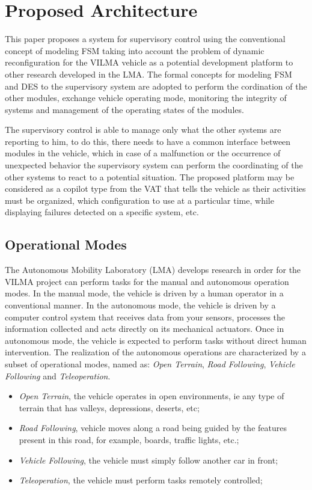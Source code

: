 \documentclass[conference]{IEEEtran}
\begin{document}
\section{Proposed Architecture}\label{sec:proposed_architec}

This paper proposes a system for supervisory control using the conventional concept of modeling FSM taking into account the problem of dynamic reconfiguration for the VILMA vehicle as a potential development platform to other research developed in the LMA. The formal concepts for modeling FSM and DES to the supervisory system are adopted to perform the cordination of the other modules, exchange vehicle operating mode, monitoring the integrity of systems and management of the operating states of the modules.

The supervisory control is able to manage only what the other systems are reporting to him, to do this, there needs to have a common interface between modules in the vehicle, which in case of a malfunction or the occurrence of unexpected behavior the supervisory system can perform the coordinating of the other systems to react to a potential situation. The proposed platform may be considered as a copilot type from the VAT that tells the vehicle as their activities must be organized, which configuration to use at a particular time, while displaying failures detected on a specific system, etc.

%
\subsection{Operational Modes}\label{subsec:operational_modes}

The Autonomous Mobility Laboratory (LMA) develops research in order for the VILMA project can perform tasks for the manual and autonomous operation modes. In the manual mode, the vehicle is driven by a human operator in a conventional manner. In the autonomous mode, the vehicle is driven by a computer control system that receives data from your sensors, processes the information collected and acts directly on its mechanical actuators. Once in autonomous mode, the vehicle is expected to perform tasks without direct human intervention. The realization of the autonomous operations are characterized by a subset of operational modes, named as: \textit{Open Terrain}, \textit{Road Following}, \textit{Vehicle Following} and \textit{Teleoperation}.

\begin{itemize}
	\item \textit{Open Terrain}, the vehicle operates in open environments, ie any type of terrain that has valleys, depressions, deserts, etc;
	\item \textit{Road Following}, vehicle moves along a road being guided by the features present in this road, for example, boards, traffic lights, etc.;
	\item \textit{Vehicle Following}, the vehicle must simply follow another car in front;
	\item \textit{Teleoperation}, the vehicle must perform tasks remotely controlled;
\end{itemize}
\end{document}
